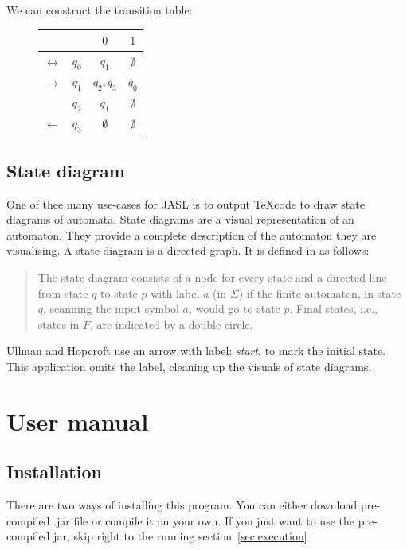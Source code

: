 \documentclass{ctuthesis}
\begin{document}
We can construct the transition table:

\begin{figure}[H]
\begin{ctucolortab}
\begin{tabular}{cc|cc}
	&&$0$ & $1$ \\\hline
	$\leftrightarrow$ & $q_0$ & $q_1$ & $\emptyset$ \\
	$\rightarrow$ & $q_1$ & $q_2,q_3$ & $q_0$ \\
	& $q_2$ & $q_1$ & $\emptyset$ \\
	$\leftarrow$ & $q_3$ & $\emptyset$ & $\emptyset$
\end{tabular}
\end{ctucolortab}
\end{figure}

\section{State diagram}
One of thee many use-cases for JASL is to output \TeX code to draw state diagrams of automata. State diagrams are a visual representation of an automaton. They provide a complete description of the automaton they are visualising. A state diagram is a directed graph. It is defined in 
\cite[Example 3.1, p.27]{hopcroft} as follows:
\begin{quote}
	The state diagram consists of a node for every state and a directed line from state $q$ to state $p$ with label $a$ (in $\Sigma$) if the finite automaton, in state $q$, scanning the input symbol $a$, would go to state $p$. Final states, i.e., states in $F$, are indicated by a double circle.
\end{quote}

Ullman and Hopcroft use an arrow with label: \textit{start}, to mark the initial state. This application omits the label, cleaning up the visuals of state diagrams.

\chapter{User manual}
\section{Installation}
There are two ways of installing this program. You can either download pre-compiled .jar file or compile it on your own. If you just want to use the pre-compiled jar, skip right to the running section~\ref{sec:execution}
\end{document}
